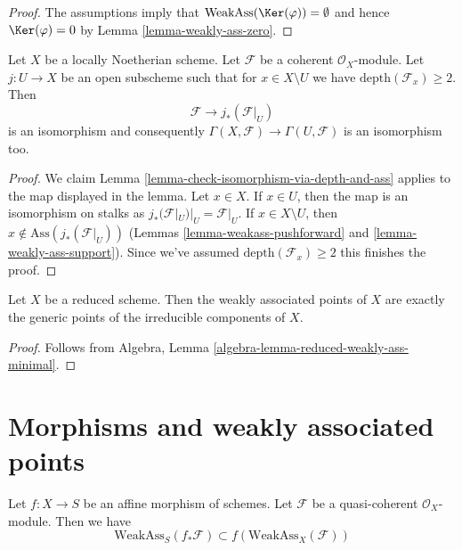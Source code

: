 \begin{proof}
The assumptions imply that $\text{WeakAss}(\Ker(\varphi)) = \emptyset$
and hence $\Ker(\varphi) = 0$ by Lemma \ref{lemma-weakly-ass-zero}.
\end{proof}

\begin{lemma}
\label{lemma-depth-2-hartog}
Let $X$ be a locally Noetherian scheme. Let $\mathcal{F}$
be a coherent $\mathcal{O}_X$-module. Let $j : U \to X$
be an open subscheme such that for $x \in X \setminus U$
we have $\text{depth}(\mathcal{F}_x) \geq 2$. Then
$$
\mathcal{F} \longrightarrow j_*(\mathcal{F}|_U)
$$
is an isomorphism and consequently
$\Gamma(X, \mathcal{F}) \to \Gamma(U, \mathcal{F})$
is an isomorphism too.
\end{lemma}

\begin{proof}
We claim Lemma \ref{lemma-check-isomorphism-via-depth-and-ass}
applies to the map displayed in the lemma.
Let $x \in X$. If $x \in U$, then the map is an
isomorphism on stalks as $j_*(\mathcal{F}|_U)|_U = \mathcal{F}|_U$.
If $x \in X \setminus U$, then $x \not \in \text{Ass}(j_*(\mathcal{F}|_U))$
(Lemmas \ref{lemma-weakass-pushforward} and \ref{lemma-weakly-ass-support}).
Since we've assumed $\text{depth}(\mathcal{F}_x) \geq 2$
this finishes the proof.
\end{proof}

\begin{lemma}
\label{lemma-weakass-reduced}
Let $X$ be a reduced scheme. Then the weakly associated points of $X$
are exactly the generic points of the irreducible components of $X$.
\end{lemma}

\begin{proof}
Follows from Algebra, Lemma \ref{algebra-lemma-reduced-weakly-ass-minimal}.
\end{proof}



\section{Morphisms and weakly associated points}
\label{section-morphisms-weakly-associated}

\begin{lemma}
\label{lemma-weakly-ass-reverse-functorial}
Let $f : X \to S$ be an affine morphism of schemes.
Let $\mathcal{F}$ be a quasi-coherent $\mathcal{O}_X$-module.
Then we have
$$
\text{WeakAss}_S(f_*\mathcal{F}) \subset f(\text{WeakAss}_X(\mathcal{F}))
$$
\end{lemma}

